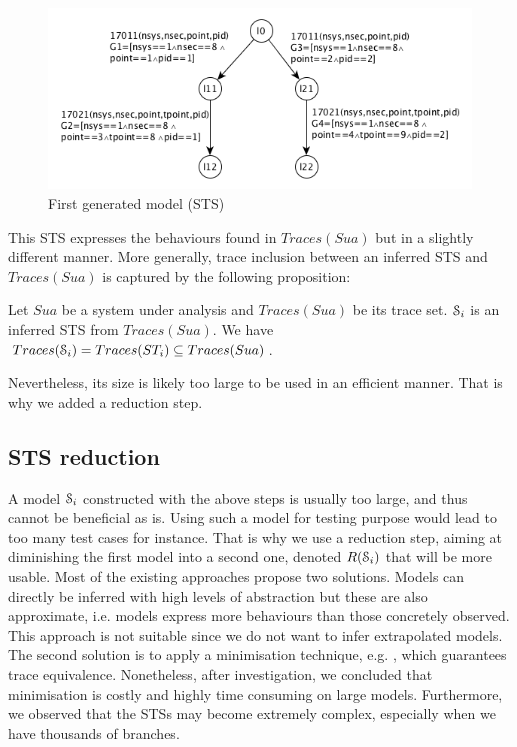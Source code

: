 \begin{figure}[H]
  \includegraphics[width=1.0\linewidth]{figures/STS1.png}

  \caption{First generated model (STS)}
  \label{fig:firstmodel}
\end{figure}

This STS expresses the behaviours found in $Traces(Sua)$ but in a
slightly different manner. More generally, trace inclusion
between an inferred STS and $Traces(Sua)$ is captured by the
following proposition:

\begin{proposition}
  Let $Sua$ be a system under analysis and $Traces(Sua)$ be its
  trace set. $\EuScript{S}_i$ is an inferred STS from
  $Traces(Sua)$.
  We have $Traces(\EuScript{S}_i) = Traces(ST_i) \subseteq Traces(Sua)$.

	\label{def:equivtraces_IOSTS}
\end{proposition}

Nevertheless, its size is likely too large to be used in an
efficient manner. That is why we added a reduction step.

\subsection{STS reduction}
\label{part3:reduction}

A model $\EuScript{S}_i$ constructed with the above steps is
usually too large, and thus cannot be beneficial as is. Using
such a model for testing purpose would lead to too many test
cases for instance. That is why we use a reduction step, aiming
at diminishing the first model into a second one, denoted
$R(\EuScript{S}_i)$ that will be more usable. Most of the
existing approaches propose two solutions. Models can directly be
inferred with high levels of abstraction but these are also
approximate, i.e. models express more behaviours than those
concretely observed. This approach is not suitable since we do
not want to infer extrapolated models. The second solution is to
apply a minimisation technique, e.g. \cite{Abdulla06}, which
guarantees trace equivalence. Nonetheless, after investigation,
we concluded that minimisation is costly and highly time
consuming on large models. Furthermore, we observed that the STSs
may become extremely complex, especially when we have thousands
of branches.


